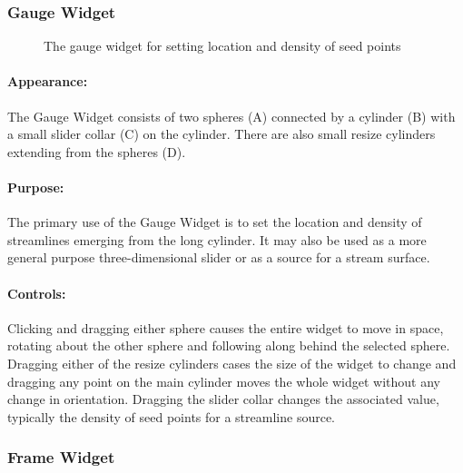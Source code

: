 \subsubsection{Gauge Widget}
\label{sec:view-gaugewidget} 

\begin{figure}[htb]
  \begin{makeimage}
  \end{makeimage}
  \gaugewidget
  \caption{\label{fig:gaugewidget} The gauge widget for setting location and
    density of seed points}
\end{figure}

\paragraph{Appearance: } The Gauge Widget consists of two spheres (A)
connected by a cylinder (B) with a small slider collar (C) on the cylinder.
There are also small resize cylinders extending from the spheres (D).

\paragraph{Purpose:} The primary use of the Gauge Widget is to set the
location and density of streamlines emerging from the long cylinder.  It
may also be used as a more general purpose three-dimensional slider or as a
source for a stream surface. 

\paragraph{Controls: } Clicking and dragging either sphere causes the
entire widget to move in space, rotating about the other sphere and
following along behind the selected sphere.  Dragging either of the resize
cylinders cases the size of the widget to change and dragging any point on
the main cylinder moves the whole widget without any change in orientation.
Dragging the slider collar changes the associated value, typically the
density of seed points for a streamline source.

\subsubsection{Frame Widget}
\label{sec:view-framewidget} 

